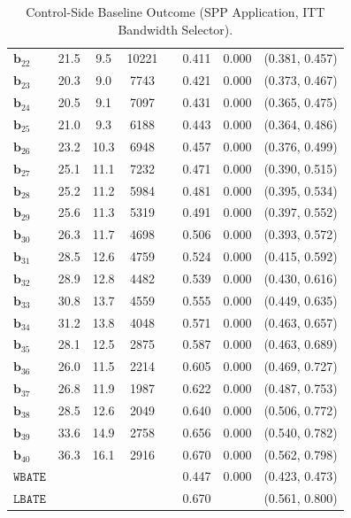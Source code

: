 \documentclass[10pt]{article}
\newcommand{\bb}{\mathbf{b}}
\begin{document}
\begin{table}[p]
\begin{tabular}{lccccccc}
   $\bb_{22}$ & 21.5 & 9.5 & 10221 &  & 0.411 & 0.000 & (0.381, 0.457)\\
   $\bb_{23}$ & 20.3 & 9.0 & 7743 &  & 0.421 & 0.000 & (0.373, 0.467)\\
   $\bb_{24}$ & 20.5 & 9.1 & 7097 &  & 0.431 & 0.000 & (0.365, 0.475)\\
   $\bb_{25}$ & 21.0 & 9.3 & 6188 &  & 0.443 & 0.000 & (0.364, 0.486)\\
   $\bb_{26}$ & 23.2 & 10.3 & 6948 &  & 0.457 & 0.000 & (0.376, 0.499)\\
   $\bb_{27}$ & 25.1 & 11.1 & 7232 &  & 0.471 & 0.000 & (0.390, 0.515)\\
   $\bb_{28}$ & 25.2 & 11.2 & 5984 &  & 0.481 & 0.000 & (0.395, 0.534)\\
   $\bb_{29}$ & 25.6 & 11.3 & 5319 &  & 0.491 & 0.000 & (0.397, 0.552)\\
   $\bb_{30}$ & 26.3 & 11.7 & 4698 &  & 0.506 & 0.000 & (0.393, 0.572)\\
   $\bb_{31}$ & 28.5 & 12.6 & 4759 &  & 0.524 & 0.000 & (0.415, 0.592)\\
   $\bb_{32}$ & 28.9 & 12.8 & 4482 &  & 0.539 & 0.000 & (0.430, 0.616)\\
   $\bb_{33}$ & 30.8 & 13.7 & 4559 &  & 0.555 & 0.000 & (0.449, 0.635)\\
   $\bb_{34}$ & 31.2 & 13.8 & 4048 &  & 0.571 & 0.000 & (0.463, 0.657)\\
   $\bb_{35}$ & 28.1 & 12.5 & 2875 &  & 0.587 & 0.000 & (0.463, 0.689)\\
   $\bb_{36}$ & 26.0 & 11.5 & 2214 &  & 0.605 & 0.000 & (0.469, 0.727)\\
   $\bb_{37}$ & 26.8 & 11.9 & 1987 &  & 0.622 & 0.000 & (0.487, 0.753)\\
   $\bb_{38}$ & 28.5 & 12.6 & 2049 &  & 0.640 & 0.000 & (0.506, 0.772)\\
   $\bb_{39}$ & 33.6 & 14.9 & 2758 &  & 0.656 & 0.000 & (0.540, 0.782)\\
   $\bb_{40}$ & 36.3 & 16.1 & 2916 &  & 0.670 & 0.000 & (0.562, 0.798)\\
  \midrule
   $\mathtt{WBATE}$ &  &  &  &  & 0.447 & 0.000 & (0.423, 0.473)\\
  \midrule
   $\mathtt{LBATE}$ &  &  &  &  & 0.670 &  & (0.561, 0.800)\\
  \bottomrule\bottomrule
\end{tabular}

    \caption{Control-Side Baseline Outcome (SPP Application, ITT Bandwidth Selector).}
    \label{tab:sa-empapp_main_itt0}
\end{table}
\end{document}
